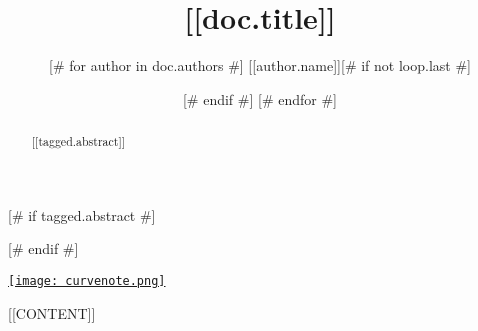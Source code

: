 \documentclass{article}
\title{[[doc.title]]}
\author{
[# for author in doc.authors #]
[[author.name]][# if not loop.last #] \and [# endif #]
[# endfor #]
}
\date{\displaydate{articleDate}}
\newcommand{\logo}{
  \href{[[doc.oxalink]]}{\texttt{[image: curvenote.png]}}
}
\begin{document}
\maketitle

[# if tagged.abstract #]\begin{abstract}[[tagged.abstract]]\end{abstract}[# endif #]

\begin{center}\logo\end{center}

[[CONTENT]]


\end{document}
